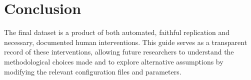 \documentclass[12pt,a4paper]{article}
\begin{document}
\section{Conclusion}
The final dataset is a product of both automated, faithful replication and necessary, documented human interventions. This guide serves as a transparent record of these interventions, allowing future researchers to understand the methodological choices made and to explore alternative assumptions by modifying the relevant configuration files and parameters.
\end{document}
